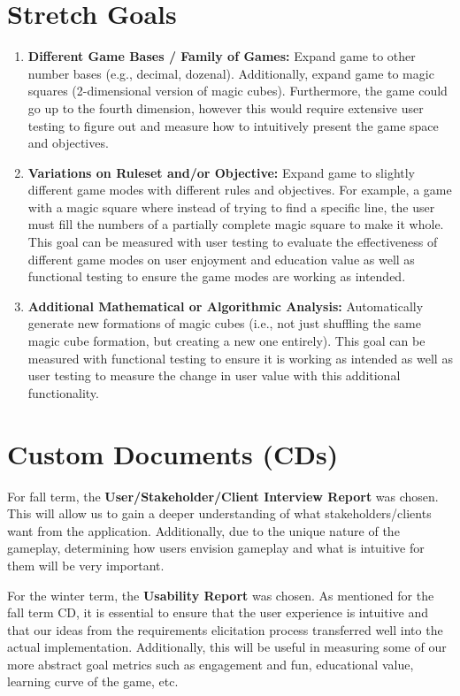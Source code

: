 \documentclass{article}
\begin{document}
\section{Stretch Goals}

\begin{enumerate}
    \item \textbf{Different Game Bases / Family of Games:} Expand game to other number bases (e.g., decimal, dozenal). Additionally, expand game to magic squares (2-dimensional version of magic cubes). Furthermore, the game could go up to the fourth dimension, however this would require extensive user testing to figure out and measure how to intuitively present the game space and objectives.
    \item \textbf{Variations on Ruleset and/or Objective:} Expand game to slightly different game modes with different rules and objectives. For example, a game with a magic square where instead of trying to find a specific line, the user must fill the numbers of a partially complete magic square to make it whole. This goal can be measured with user testing to evaluate the effectiveness of different game modes on user enjoyment and education value as well as functional testing to ensure the game modes are working as intended.
    \item \textbf{Additional Mathematical or Algorithmic Analysis:} Automatically generate new formations of magic cubes (i.e., not just shuffling the same magic cube formation, but creating a new one entirely). This goal can be measured with functional testing to ensure it is working as intended as well as user testing to measure the change in user value with this additional functionality.
\end{enumerate}

\section{Custom Documents (CDs)}

For fall term, the \textbf{User/Stakeholder/Client Interview Report} was chosen. This will allow us to gain a deeper understanding of what stakeholders/clients want from the application. Additionally, due to the unique nature of the gameplay, determining how users envision gameplay and what is intuitive for them will be very important.

For the winter term, the \textbf{Usability Report} was chosen. As mentioned for the fall term CD, it is essential to ensure that the user experience is intuitive and that our ideas from the requirements elicitation process transferred well into the actual implementation. Additionally, this will be useful in measuring some of our more abstract goal metrics such as engagement and fun, educational value, learning curve of the game, etc.
\end{document}
